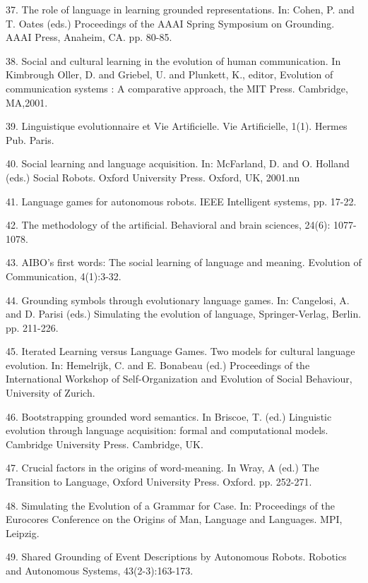 37. \citet{Steels:01b} The role of language in learning grounded representations. In: Cohen, P. and T. Oates (eds.) Proceedings of the AAAI Spring Symposium on Grounding. AAAI Press, Anaheim, CA. pp. 80-85. 

38. \citet{Steels:01c} Social and cultural learning in the evolution of human communication. In Kimbrough Oller, D. and Griebel, U. and Plunkett, K., editor, Evolution of communication systems : A comparative approach, the MIT Press. Cambridge, MA,2001.

39. \citet{Steels:01d} Linguistique evolutionnaire et Vie Artificielle. Vie Artificielle, 1(1). Hermes Pub. Paris. 

40. \citet{Steels:01e} Social learning and language acquisition. In: McFarland, D. and  O. Holland (eds.) Social Robots. 
Oxford University Press. Oxford, UK, 2001.nn

41. \citet{Steels:01f} Language games for autonomous robots. IEEE Intelligent systems, pp. 17-22. 

42. \citet{Steels:01g} The methodology of the artificial. Behavioral and brain sciences, 24(6): 1077-1078. 

43. \citet{Steels:01h} AIBO's first words: The social learning of language and meaning. 
Evolution of Communication, 4(1):3-32. 

44. \citet{Steels:02b} Grounding symbols through evolutionary language games. In: Cangelosi, A. and D. Parisi (eds.) 
Simulating the evolution of language, Springer-Verlag, Berlin. pp. 211-226. 

45. \citet{Steels:02c} Iterated Learning versus Language Games. Two models for cultural language evolution. In: Hemelrijk, C. and 
E. Bonabeau (ed.) Proceedings of the International Workshop of Self-Organization and Evolution of 
Social Behaviour, University of Zurich. 

46. \citet{Steels:02d} Bootstrapping grounded word semantics. In Briscoe, T. (ed.) Linguistic evolution through 
language acquisition: formal and computational models. Cambridge University Press. Cambridge, UK. 

47. \citet{Steels:02e} Crucial factors in the origins of word-meaning. In Wray, A (ed.)
The Transition to Language, Oxford University Press. Oxford. pp. 252-271.  

48. \citet{Steels:02f} Simulating the Evolution of a Grammar for Case. In: Proceedings of the Eurocores Conference 
on the Origins of Man, Language and Languages. MPI, Leipzig.

49. \citet{Steels:03a} Shared Grounding of Event Descriptions by Autonomous Robots. 
Robotics and Autonomous Systems, 43(2-3):163-173.


